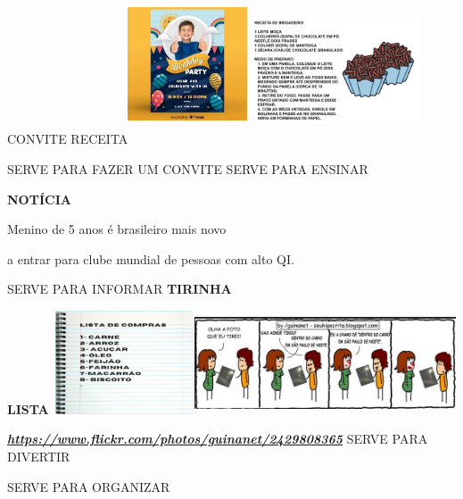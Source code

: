 \begin{escola}
CONVITE
RECEITA\includegraphics[width=1.39444in,height=1.86944in]{media/image132.jpg}\includegraphics[width=2.02014in,height=1.72778in]{media/image134.png}

SERVE PARA FAZER UM CONVITE SERVE PARA ENSINAR

\textbf{NOTÍCIA}

Menino de 5 anos é brasileiro mais novo

a entrar para clube mundial de pessoas com alto QI.

SERVE PARA INFORMAR \textbf{TIRINHA}

\textbf{LISTA}
\includegraphics[width=1.65625in,height=1.20625in]{media/image135.png}\includegraphics[width=3.04583in,height=1.19514in]{media/image136.png}

\href{https://www.flickr.com/photos/guinanet/2429808365}{\textbf{\emph{https://www.flickr.com/photos/guinanet/2429808365}}}
SERVE PARA DIVERTIR

SERVE PARA ORGANIZAR


\end{escola}

